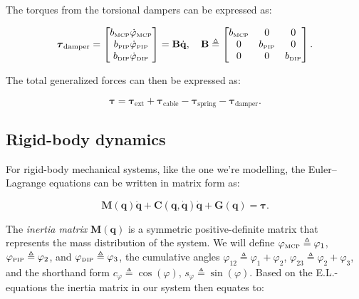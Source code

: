 The torques from the torsional dampers can be expressed as:

\begin{equation}
    \label{eq:modelling_damper_torques}
    \boldsymbol{\tau}_{\text{damper}} = \begin{bmatrix}
        b_{{\scriptscriptstyle\mathrm{MCP}}}\dot{\varphi}_{{\scriptscriptstyle\mathrm{MCP}}} \\
        b_{{\scriptscriptstyle\mathrm{PIP}}}\dot{\varphi}_{{\scriptscriptstyle\mathrm{PIP}}} \\
        b_{{\scriptscriptstyle\mathrm{DIP}}}\dot{\varphi}_{{\scriptscriptstyle\mathrm{DIP}}}
    \end{bmatrix}
    = \mathbf{B} \dot{\mathbf{q}},
    \quad \mathbf{B} \triangleq
    \begin{bmatrix}
        b_{{\scriptscriptstyle\mathrm{MCP}}} & 0 & 0 \\
        0 & b_{{\scriptscriptstyle\mathrm{PIP}}} & 0 \\
        0 & 0 & b_{{\scriptscriptstyle\mathrm{DIP}}}
    \end{bmatrix}.
\end{equation}

The total generalized forces can then be expressed as:

\begin{equation}
    \label{eq:modelling_total_generalized_forces}
    \boldsymbol{\tau} = \boldsymbol{\tau}_{\text{ext}} + \boldsymbol{\tau}_{\text{cable}} - \boldsymbol{\tau}_{\text{spring}} - \boldsymbol{\tau}_{\text{damper}}.
\end{equation}

\subsection{Rigid-body dynamics}

For rigid-body mechanical systems, like the one we're modelling, the Euler--Lagrange equations can be written in matrix form as:

\begin{equation}
    \label{eq:modelling_euler_lagrange_matrix_form}
    \mathbf{M}(\mathbf{q})\ddot{\mathbf{q}} + \mathbf{C}(\mathbf{q}, \dot{\mathbf{q}})\dot{\mathbf{q}} + \mathbf{G}(\mathbf{q}) = \boldsymbol{\tau}.
\end{equation}

The \textit{inertia matrix} $\mathbf{M}(\mathbf{q})$ is a symmetric positive-definite matrix that represents the mass distribution of the system. We will define $\varphi_{{\scriptscriptstyle\mathrm{MCP}}} \triangleq \varphi_1$, $\varphi_{{\scriptscriptstyle\mathrm{PIP}}} \triangleq \varphi_2$, and $\varphi_{{\scriptscriptstyle\mathrm{DIP}}} \triangleq \varphi_3$, the cumulative angles $\varphi_{12} \triangleq \varphi_1 + \varphi_2$, $\varphi_{23} \triangleq \varphi_2 + \varphi_3$, and the shorthand form $c_\varphi \triangleq \cos(\varphi)$, $s_\varphi \triangleq \sin(\varphi)$. Based on the E.L.-equations the inertia matrix in our system then equates to:

